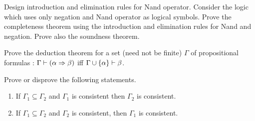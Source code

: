 \begin{exercise}
Design introduction and elimination rules for Nand operator. Consider the logic which uses only negation and Nand operator as logical symbols. Prove the completeness theorem using the introduction and elimination rules for Nand and negation. Prove also the soundness theorem.
\end{exercise}
 
\begin{exercise}
Prove the deduction theorem for a set (need not be finite) $\Gamma$ of propositional formulas : $\Gamma \vdash (\alpha \Rightarrow \beta)$ iff $\Gamma \cup \{\alpha\} \vdash \beta$.
\end{exercise}

\begin{exercise}
Prove or disprove the following statements.
\begin{enumerate}
\item If $\Gamma_1 \subseteq \Gamma_2$ and $\Gamma_1$ is consistent then $\Gamma_2$ is consistent.
\item If $\Gamma_1 \subseteq \Gamma_2$ and $\Gamma_2$ is consistent, then $\Gamma_1$ is consistent.
\end{enumerate}
\end{exercise}